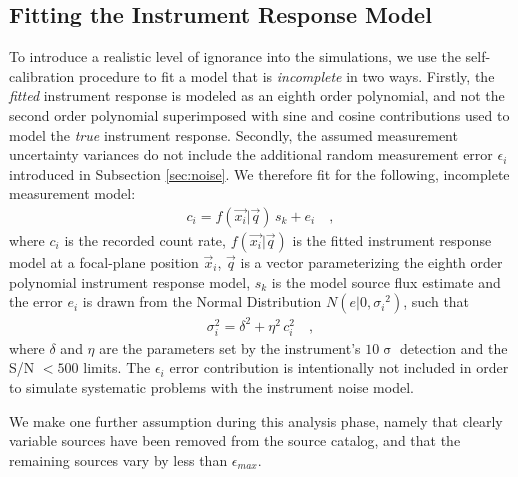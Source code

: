 \documentclass[preprint,pdftex]{aastex}
\begin{document}
\subsection{Fitting the Instrument Response Model}
To introduce a realistic level of ignorance into the simulations, we use the self-calibration procedure to fit a model that is \textit{incomplete} in two ways. Firstly, the \textit{fitted} instrument response is modeled as an eighth order polynomial, and not the second order polynomial superimposed with sine and cosine contributions used to model the \textit{true} instrument response. Secondly, the assumed measurement uncertainty variances do not include the additional random measurement error $\epsilon_{i}$ introduced in Subsection \ref{sec:noise}. We therefore fit for the following, incomplete measurement model:
\begin{eqnarray*}
c_i = f(\vec{x_i} | \vec{q}) \, s_{k} + e_{i} \quad ,
\end{eqnarray*}
where $c_i$ is the recorded count rate, $f(\vec{x_i} | \vec{q})$ is the fitted instrument response model at a focal-plane position $\vec{x}_i$, $\vec{q}$ is a vector parameterizing the eighth order polynomial instrument response model, $s_k$ is the model source flux estimate and the error $e_i$ is drawn from the Normal Distribution $N(e|0,{\sigma_i}^2)$, such that
\begin{eqnarray*}
\sigma_{{i}}^{2} = \delta^{2} + \eta^{2}\, c^{2}_i \quad ,
\end{eqnarray*} 
where $\delta$ and $\eta$ are the parameters set by the instrument's $10\upsigma$ detection and the S/N $<500$ limits. The $\epsilon_i$ error contribution is intentionally not included in order to simulate systematic problems with the instrument noise model. 

We make one further assumption during this analysis phase, namely that clearly variable sources have been removed from the source catalog, and that the remaining sources vary by less than $\epsilon_{max}$.
\end{document}
